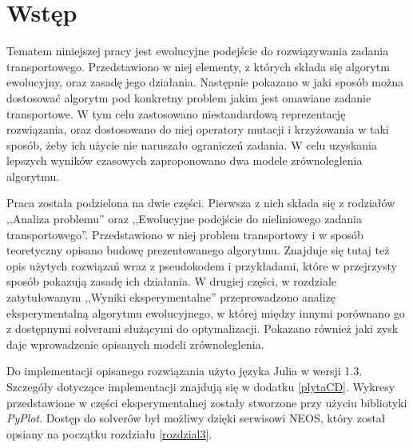 \chapter{Wstęp}
\thispagestyle{chapterBeginStyle}

Tematem niniejszej pracy jest ewolucyjne podejście do rozwiązywania zadania transportowego. Przedstawiono w niej elementy, z których składa się algorytm 
ewolucyjny, oraz zasadę jego działania. Następnie pokazano w jaki sposób można dostosować algorytm pod konkretny problem jakim 
jest omawiane zadanie transportowe. W tym celu zastosowano niestandardową reprezentację rozwiązania, oraz dostosowano do niej operatory mutacji 
i krzyżowania w taki sposób, żeby ich użycie nie naruszało ograniczeń zadania. W celu uzyskania lepszych wyników czasowych zaproponowano dwa 
modele zrównoleglenia algorytmu. 

Praca została podzielona na dwie części. Pierwsza z nich składa się z rodziałów ,,Analiza problemu'' oraz 
,,Ewolucyjne podejście do nieliniowego zadania transportowego''. Przedstawiono w niej problem transportowy i w sposób teoretyczny opisano budowę 
prezentowanego algorytmu. 
Znajduje się tutaj też opis użytych rozwiązań wraz z pseudokodem i przykładami, które w przejrzysty sposób pokazują zasadę ich działania. 
W drugiej części, w rozdziale zatytułowanym ,,Wyniki eksperymentalne'' przeprowadzono analizę eksperymentalną algorytmu ewolucyjnego, w której między 
innymi porównano go z dostępnymi solverami służącymi do optymalizacji. Pokazano również jaki zysk daje wprowadzenie opisanych modeli zrównoleglenia. 

Do implementacji opisanego rozwiązania użyto języka Julia w wersji 1.3. Szczegóły dotyczące implementacji znajdują się w dodatku \ref{plytaCD}. 
Wykresy przedstawione w części eksperymentalnej zostały stworzone przy użyciu bibliotyki \textit{PyPlot}. Dostęp do solverów był możliwy dzięki 
serwisowi NEOS, który został opsiany na początku rozdziału \ref{rozdzial3}.